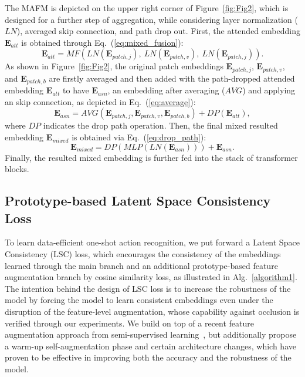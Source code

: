 \documentclass[lettersize,journal]{IEEEtran}
\begin{document}
The MAFM is depicted on the upper right corner of Figure~\ref{fig:Fig2}, which is designed for a further step of aggregation, while considering layer normalization ($LN$), averaged skip connection, and path drop out. First, the attended embedding $\mathbf{E}_{att}$ is obtained through Eq.~(\ref{eq:mixed_fusion}):
\begin{equation}\label{eq:mixed_fusion}
    \mathbf{E}_{att} = MF(LN(\mathbf{E}_{patch,j}),~LN(\mathbf{E}_{patch,v}),~LN(\mathbf{E}_{patch,j})).
\end{equation}
As shown in Figure~\ref{fig:Fig2}, the original patch embeddings $\mathbf{E}_{patch,j}$, $\mathbf{E}_{patch,v}$, and $\mathbf{E}_{patch,b}$ are firstly averaged and then added with the path-dropped attended embedding $\mathbf{E}_{att}$ to have $\mathbf{E}_{asn}$, an embedding after averaging ($AVG$) and applying an skip connection, as depicted in Eq.~(\ref{eq:average}):
\begin{equation}\label{eq:average}
    \mathbf{E}_{asn} = AVG(\mathbf{E}_{patch,j}, \mathbf{E}_{patch,v}, \mathbf{E}_{patch,b}) + DP(\mathbf{E}_{att}),
\end{equation}
where $DP$ indicates the drop path operation. Then, the final mixed resulted embedding $\mathbf{E}_{mixed}$ is obtained via Eq.~(\ref{eq:drop_path}):
\begin{equation}\label{eq:drop_path}
    \mathbf{E}_{mixed} = DP(MLP(LN(\mathbf{E}_{asn}))) + \mathbf{E}_{asn}.
\end{equation}
Finally, the resulted mixed embedding is further fed into the stack of transformer blocks.

\subsection{Prototype-based Latent Space Consistency Loss}
\label{sec:prototype_loss}
To learn data-efficient one-shot action recognition, we put forward a Latent Space Consistency (LSC) loss, which encourages the consistency of the embeddings learned through the main branch and an additional prototype-based feature augmentation branch by cosine similarity loss, as illustrated in Alg.~\ref{algorithm1}.
The intention behind the design of LSC loss is to increase the robustness of the model by forcing the model to learn consistent embeddings even under the disruption of the feature-level augmentation, whose capability against occlusion is verified through our experiments.
We build on top of a recent feature augmentation approach from semi-supervised learning~\cite{kuo2020featmatch}, but additionally propose a warm-up self-augmentation phase and certain architecture changes, which have proven to be effective in improving both the accuracy and the robustness of the model.
\end{document}
